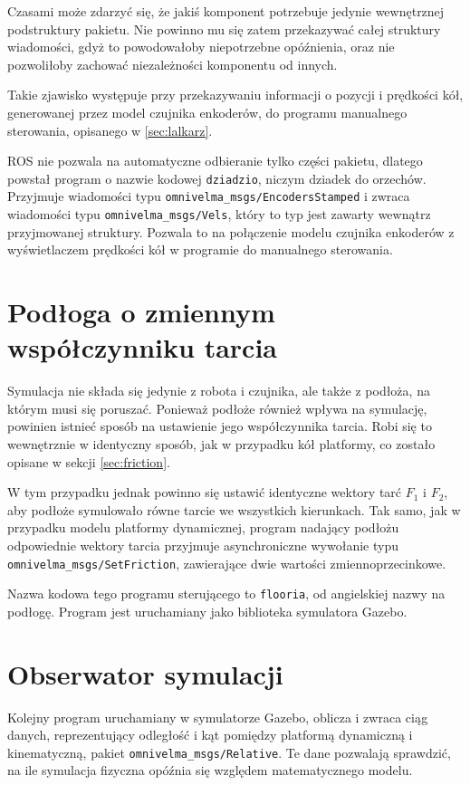 	Czasami może zdarzyć się, że jakiś komponent potrzebuje jedynie wewnętrznej podstruktury pakietu.
	Nie powinno mu się zatem przekazywać całej struktury wiadomości, gdyż to powodowałoby niepotrzebne opóźnienia, oraz nie pozwoliłoby zachować niezależności 
	komponentu od innych.
	
	Takie zjawisko występuje przy przekazywaniu informacji o pozycji i prędkości kół, generowanej przez model czujnika enkoderów, do programu
	manualnego sterowania, opisanego w \ref{sec:lalkarz}.
	
	ROS nie pozwala na automatyczne odbieranie tylko części pakietu, dlatego powstał program o nazwie kodowej \texttt{dziadzio}, niczym dziadek do orzechów.
	Przyjmuje wiadomości typu \texttt{omnivelma\_msgs/EncodersStamped} i zwraca wiadomości typu \texttt{omnivelma\_msgs/Vels}, który to typ 
	jest zawarty wewnątrz przyjmowanej struktury. Pozwala to na połączenie modelu czujnika enkoderów z wyświetlaczem prędkości kół w programie do manualnego sterowania.

\section{Podłoga o zmiennym współczynniku tarcia}
	\label{sec:flooria}
	Symulacja nie składa się jedynie z robota i czujnika, ale także z podłoża, na którym musi się poruszać.
	Ponieważ podłoże również wpływa na symulację, powinien istnieć sposób na ustawienie jego współczynnika tarcia.
	Robi się to wewnętrznie w identyczny sposób, jak w przypadku kół platformy, co zostało opisane w sekcji \ref{sec:friction}.
	
	W tym przypadku jednak powinno się ustawić identyczne wektory tarć $F_1$ i $F_2$, aby podłoże symulowało równe tarcie we wszystkich kierunkach.
	Tak samo, jak w przypadku modelu platformy dynamicznej, program nadający podłożu odpowiednie wektory tarcia przyjmuje asynchroniczne wywołanie 
	typu \texttt{omnivelma\_msgs/SetFriction}, zawierające dwie wartości zmiennoprzecinkowe.
	
	Nazwa kodowa tego programu sterującego to \texttt{flooria}, od angielskiej nazwy na podłogę.
	Program jest uruchamiany jako biblioteka symulatora Gazebo.
	
\section{Obserwator symulacji}
	\label{sec:ocznica}
	Kolejny program uruchamiany w symulatorze Gazebo, oblicza i zwraca ciąg danych, reprezentujący 
	odległość i kąt pomiędzy platformą dynamiczną i kinematyczną, pakiet \texttt{omnivelma\_msgs/Relative}.
	Te dane pozwalają sprawdzić, na ile symulacja fizyczna opóźnia się względem matematycznego modelu.
	
